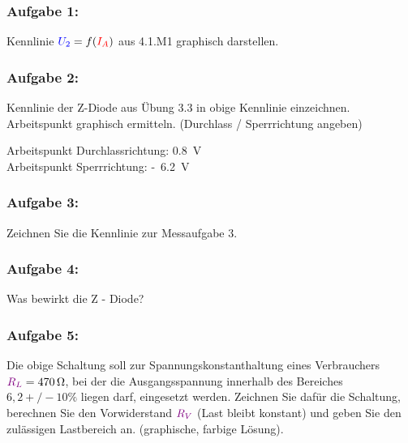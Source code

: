 \documentclass[11pt,a4paper,titlepage]{scrreprt}
\begin{document}
            \subsubsection{Aufgabe 1:} Kennlinie $\textcolor{blue}{U_2} = f(\textcolor{red}{I_A})$ aus 4.1.M1 graphisch darstellen.

			\subsubsection{Aufgabe 2:} Kennlinie der Z-Diode aus Übung 3.3 in obige Kennlinie einzeichnen. Arbeitspunkt graphisch ermitteln. (Durchlass / Sperrrichtung angeben)
            
                Arbeitspunkt Durchlassrichtung: \SI{0,8}{\volt}\\
                Arbeitspunkt Sperrrichtung: \SI{6,2}[-]{\volt}


			\subsubsection{Aufgabe 3:} Zeichnen Sie die Kennlinie zur Messaufgabe 3.


			\subsubsection{Aufgabe 4:} Was bewirkt die Z - Diode?
            

			\subsubsection{Aufgabe 5:} Die obige Schaltung soll zur Spannungskonstanthaltung eines Verbrauchers $\textcolor{violet}{R_L} = \SI{470}{\ohm}$, bei der die Ausgangsspannung innerhalb des Bereiches $6,2 +/- 10\%$ liegen darf, eingesetzt werden. Zeichnen Sie dafür die Schaltung, berechnen Sie den Vorwiderstand $\textcolor{violet}{R_V}$ (Last bleibt konstant) und geben Sie den zulässigen Lastbereich an. (graphische, farbige Lösung).
            
        

    \listoftables
    \listoffigures
\end{document}
